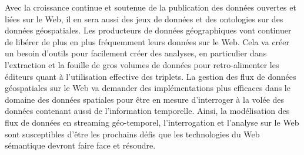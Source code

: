 Avec la croissance continue et soutenue de la publication des donn\'{e}es ouvertes et li\'{e}es sur le Web, il en sera aussi des jeux de donn\'{e}es et des ontologies sur des donn\'{e}es g\'{e}ospatiales. Les producteurs de donn\'{e}es  g\'{e}ographiques vont continuer de lib\'{e}rer de plus en plus fr\'{e}quemment leurs donn\'{e}es sur le Web. Cela va cr\'{e}er un besoin d'outils pour facilement cr\'{e}er des analyses, en particulier dans l'extraction et la fouille de gros volumes de donn\'{e}es pour retro-alimenter les \'{e}diteurs quant à l'utilisation effective des triplets. La gestion des flux de donn\'{e}es g\'{e}ospatiales sur le Web va demander des impl\'{e}mentations plus efficaces dans le domaine des donn\'{e}es spatiales pour \^{e}tre en mesure d'interroger à la vol\'{e}e des donn\'{e}es contenant aussi de l'information temporelle. Ainsi, la mod\'{e}lisation des flux de donn\'{e}es en streaming g\'{e}o-temporel, l'interrogation et l'analyse sur le Web sont susceptibles d'\^{e}tre les prochains d\'{e}fis que les technologies du Web s\'{e}mantique devront faire face et r\'{e}soudre.

 